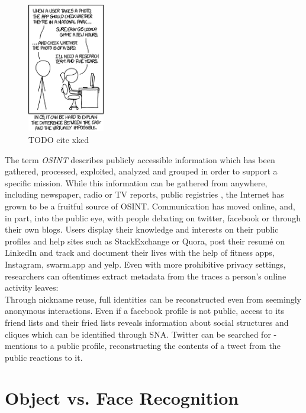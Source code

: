 \documentclass[twoside,a4paper]{article}
\begin{document}
\begin{figure}
  \centering
    \includegraphics[width=0.3\textwidth]{images/xkcd}
  \caption{TODO cite xkcd}
  \label{fig:xkcd}
\end{figure}

The term \emph{\gls{OSINT}} describes publicly accessible information which has been gathered, processed, exploited, analyzed and grouped in order to support a specific mission.
While this information can be gathered from anywhere, including newspaper, radio or TV reports, public registries , the Internet has grown to be a fruitful source of OSINT. Communication has moved online, and, in part, into the public eye, with people debating on twitter, facebook or through their own blogs. Users display their knowledge and interests on their public profiles and help sites such as StackExchange or Quora, post their resumé on LinkedIn and track and document their lives with the help of fitness apps, Instagram, swarm.app and yelp. Even with more prohibitive privacy settings, researchers can oftentimes extract metadata from the traces a person's online activity leaves:\\
Through nickname reuse, full identities can be reconstructed even from seemingly anonymous interactions. Even if a facebook profile is not public, access to its friend lists and their fried lists reveals information about social structures and cliques which can be identified through \gls{SNA}. Twitter can be searched for \@-mentions to a public profile, reconstructing the contents of a tweet from the public reactions to it.

\section{Object vs. Face Recognition}
\label{sec:object_vs_face}






\newpage
\nocite{*}

\end{document}
